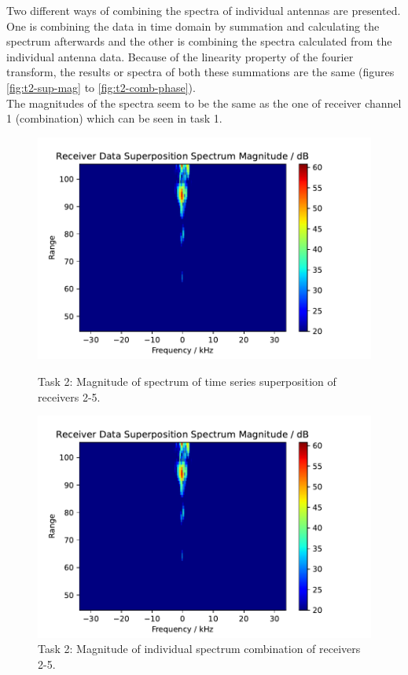 Two different ways of combining the spectra of individual antennas are presented. One is combining the data in time domain by summation and calculating the spectrum afterwards and the other is combining the spectra calculated from the individual antenna data. Because of the linearity property of the fourier transform, the results or spectra of both these summations are the same (figures \ref{fig:t2-sup-mag} to \ref{fig:t2-comb-phase}).\\

The magnitudes of the spectra seem to be the same as the one of receiver channel 1 (combination) which can be seen in task 1.

\begin{figure}
    \centering
    \begin{minipage}{0.48\textwidth}
        \centering
        \includegraphics[width=\textwidth]{graphics/t2/t2-sup-mag.pdf}
    \caption{Task 2: Magnitude of spectrum of time series superposition of receivers 2-5.}
    \label{fig:t2-sup-mag}
    \end{minipage}\hfill
    \begin{minipage}{0.48\textwidth}
        \centering
             \includegraphics[width=\textwidth]{graphics/t2/t2-sup-mag.pdf}
    \caption{Task 2: Magnitude of individual spectrum combination of receivers 2-5.}
    \label{fig:t2-comb-mag}
    \end{minipage}
\end{figure}

